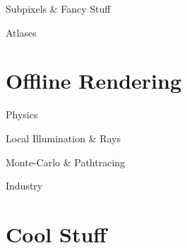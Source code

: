 \documentclass{lug}
\begin{document}
\begin{frame}{Subpixels \& Fancy Stuff}

\end{frame}

\begin{frame}{Atlases}

\end{frame}

\section{Offline Rendering}

\begin{frame}{Physics}

\end{frame}

\begin{frame}{Local Illumination \& Rays}

\end{frame}

\begin{frame}{Monte-Carlo \& Pathtracing}

\end{frame}

\begin{frame}{Industry}

\end{frame}

\section{Cool Stuff}
\end{document}
